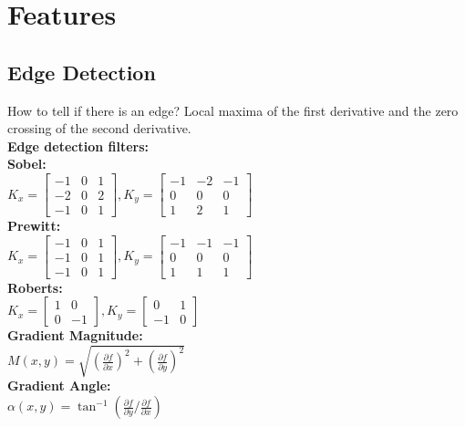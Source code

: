 \section*{Features}
\subsection*{Edge Detection}
How to tell if there is an edge? Local maxima of the first derivative and the zero crossing of the second derivative.\\
\textbf{Edge detection filters:}\\
\textbf{Sobel:}\\
$K_x = \begin{bmatrix}
-1 & 0 & 1\\
-2 & 0 & 2\\
-1 & 0 & 1
\end{bmatrix}, K_y = \begin{bmatrix}
-1 & -2 & -1\\
0 & 0 & 0\\
1 & 2 & 1
\end{bmatrix}$\\
\textbf{Prewitt:}\\
$K_x = \begin{bmatrix}
-1 & 0 & 1\\
-1 & 0 & 1\\
-1 & 0 & 1
\end{bmatrix}, K_y = \begin{bmatrix}
-1 & -1 & -1\\
0 & 0 & 0\\
1 & 1 & 1
\end{bmatrix}$\\
\textbf{Roberts:}\\
$K_x = \begin{bmatrix}
1 & 0\\
0 & -1
\end{bmatrix}, K_y = \begin{bmatrix}
0 & 1\\
-1 & 0
\end{bmatrix}$\\

\textbf{Gradient Magnitude:}\\
$M(x, y) = \sqrt{(\frac{\partial f}{\partial x})^{2} + (\frac{\partial f}{\partial y})^{2}}$\\
\textbf{Gradient Angle:} \\
$\alpha(x, y) = \tan^{-1}(\frac{\partial f}{\partial y} / \frac{\partial f}{\partial x})$\\


